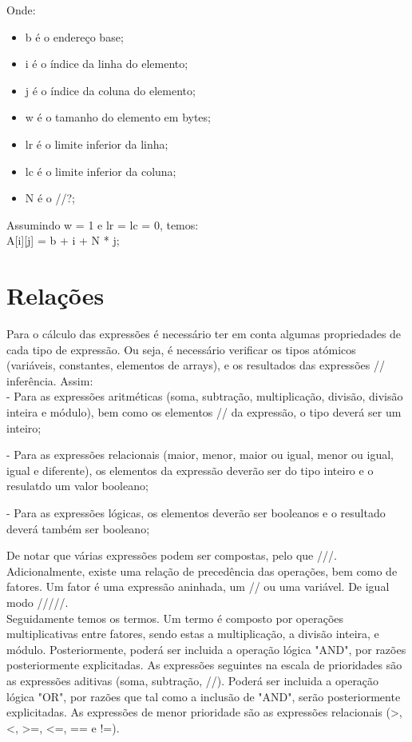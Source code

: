 Onde:

\begin{itemize}
\item b é o endereço base;
\item i é o índice da linha do elemento;
\item j é o índice da coluna do elemento;
\item w é o tamanho do elemento em bytes;
\item lr é o limite inferior da linha;
\item lc é o limite inferior da coluna;
\item N é o //?;
\end{itemize}

Assumindo w = 1 e lr = lc = 0, temos:\\

A[i][j] = b + i + N * j;\\


\section{Relações}
\label{sec:relacoes:analise}

Para o cálculo das expressões é necessário ter em conta algumas propriedades de cada tipo de expressão. Ou seja, é necessário verificar os tipos atómicos (variáveis, constantes, elementos de arrays), e os resultados das expressões  // inferência. Assim:\\

- Para as expressões aritméticas (soma, subtração, multiplicação, divisão, divisão inteira e módulo), bem como os elementos // da expressão, o tipo deverá ser um inteiro;

- Para as expressões relacionais (maior, menor, maior ou igual, menor ou igual, igual e diferente), os elementos da expressão deverão ser do tipo inteiro e o resulatdo um valor booleano;

- Para as expressões lógicas, os elementos deverão ser booleanos e o resultado deverá também ser booleano;

De notar que várias expressões podem ser compostas, pelo que ///. Adicionalmente, existe uma relação de precedência das operações, bem como de fatores. Um fator é uma expressão aninhada, um // ou uma variável. De igual modo /////.\\

Seguidamente temos os termos. Um termo é composto por operações multiplicativas entre fatores, sendo estas a multiplicação, a divisão inteira, e módulo. Posteriormente, poderá ser incluida a operação lógica "AND", por razões posteriormente explicitadas. As expressões seguintes na escala de prioridades são as expressões aditivas (soma, subtração, //). Poderá ser incluida a operação lógica "OR", por razões que tal como a inclusão de "AND", serão posteriormente explicitadas. As expressões de menor prioridade são as expressões relacionais (>, <, >=, <=, == e !=).\\

